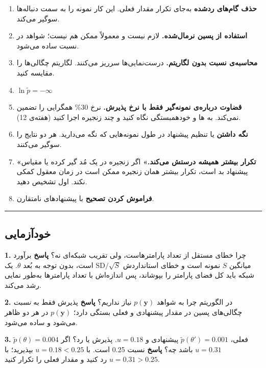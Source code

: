 \begin{enumerate}
\def\labelenumi{\arabic{enumi}.}
\tightlist
\item
  \textbf{حذف گام‌های ردشده} به‌جای تکرار مقدار فعلی. این کار نمونه را به
  سمت دنباله‌ها سوگیر می‌کند.
\item
  \textbf{استفاده از پسین نرمال‌شده.} لازم نیست و معمولاً ممکن هم نیست؛
  شواهد در نسبت ساده می‌شود.
\item
  \textbf{محاسبه‌ی نسبت بدون لگاریتم.} درست‌نمایی‌ها سرریز می‌کنند. لگاریتم
  چگالی‌ها را مقایسه کنید.
\item
  \(\ln\tilde p = -\infty\)
\item
  \textbf{قضاوت درباره‌ی نمونه‌گیر فقط با نرخ پذیرش.} نرخ 30\% همگرایی را
  تضمین نمی‌کند. به ها و خودهمبستگی نگاه کنید و چند زنجیره اجرا
  کنید (هفته‌ی 12).
\item
  \textbf{نگه داشتن } یا تنظیم پیشنهاد در طول نمونه‌هایی که
  نگه می‌دارید. هر دو نتایج را سوگیر می‌کنند.
\item
  \textbf{«تکرار بیشتر همیشه درستش می‌کند.»} اگر زنجیره در یک مُد گیر کرده
  یا مقیاس پیشنهاد بد است، تکرار بیشتر همان زنجیره ممکن است در زمان
  معقول کمکی نکند. اول تشخیص دهید.
\item
  \textbf{فراموش کردن تصحیح } با پیشنهادهای نامتقارن.
\end{enumerate}

\begin{center}\rule{0.5\linewidth}{0.5pt}\end{center}

\subsection{خودآزمایی}

\textbf{1.} چرا خطای  مستقل از تعداد پارامترهاست، ولی
تقریب شبکه‌ای نه؟ \textbf{پاسخ} برآورد  میانگین \(S\) نمونه است و
خطای استانداردش \(\mathrm{SD}/\sqrt{S}\) است، بدون توجه به بُعد
\(\theta\). یک شبکه باید کل فضای پارامتر را بپوشاند، پس اندازه‌اش با
تعداد پارامترها به‌طور نمایی رشد می‌کند.

\textbf{2.} در الگوریتم  چرا به شواهد \(p(\mathbf{y})\)
نیاز نداریم؟ \textbf{پاسخ} پذیرش فقط به \emph{نسبت} چگالی‌های پسین در
مقدار پیشنهادی و فعلی بستگی دارد؛ \(p(\mathbf{y})\) در هر دو ظاهر می‌شود
و ساده می‌شود.

\textbf{3.} \(\tilde p(\theta) = 0.004\) فعلی،
\(\tilde p(\theta') = 0.001\) پیشنهادی و \(u = 0.18\). پذیرش یا رد؟ اگر
\(u = 0.31\) باشد چه؟ \textbf{پاسخ} نسبت 0.25 است. با
\(u = 0.18 < 0.25\) بپذیرید؛ با \(u = 0.31 > 0.25\) رد کنید و مقدار فعلی
را تکرار کنید.

